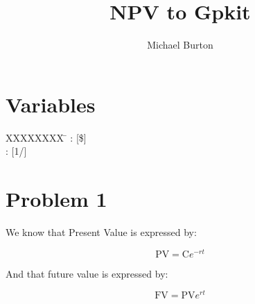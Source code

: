 \documentclass[10pt, a4paper]{article}
\begin{document}
\title{NPV to Gpkit}
\author{Michael Burton}
\maketitle

\section*{Variables}

\begin{tabbing}
  XXXXXXXX \= \kill%
 : [\$]  \\
: [1/]   
\end{tabbing}

\section*{Problem 1}

We know that Present Value is expressed by: 

\[\text{PV} = \text{C} e^{-rt} \]


And that future value is expressed by: 

\[\text{FV} = \text{PV} e^{rt} \]
\end{document}
